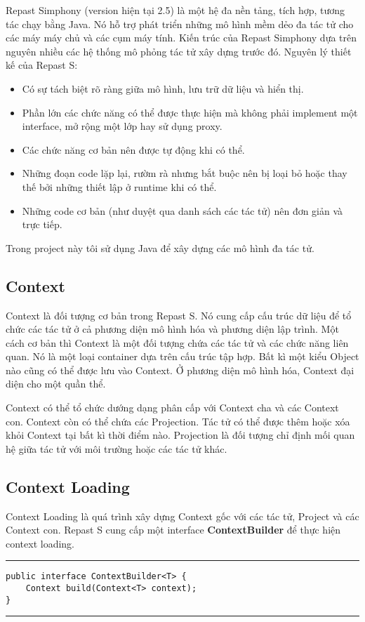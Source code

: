 \documentclass[../report.tex]{subfiles}
\begin{document}
\newcommand{\HRule}{\rule{\linewidth}{1pt}} %

Repast Simphony (version hiện tại 2.5) là một hệ đa nền tảng, tích hợp, tương tác chạy bằng Java. Nó hỗ trợ 
phát triển những mô hình mềm dẻo đa tác tử cho các máy máy chủ và các cụm máy tính. \cite{repast-simphony}
Kiến trúc của Repast Simphony dựa trên nguyên nhiều các hệ thống mô phỏng tác tử xây dựng trước đó. 
Nguyên lý thiết kế của Repast S: \cite{repast-reference}
\begin{itemize}
    \item Có sự tách biệt rõ ràng giữa mô hình, lưu trữ dữ liệu và hiển thị. 
    \item Phần lớn các chức năng có thể được thực hiện mà không phải implement một interface, mở rộng 
        một lớp hay sử dụng proxy. 
    \item Các chức năng cơ bản nên được tự động khi có thể.
    \item Những đoạn code lặp lại, rườm rà nhưng bắt buộc nên bị loại bỏ hoặc thay thế bởi những thiết lập ở runtime khi có thể. 
    \item Những code cơ bản (như duyệt qua danh sách các tác tử) nên đơn giản và trực tiếp. 
\end{itemize}

Trong project này tôi sử dụng Java để xây dựng các mô hình đa tác tử. 

\subsection{Context}
Context là đối tượng cơ bản trong Repast S. Nó cung cấp cấu trúc dữ liệu để tổ chức các tác tử 
ở cả phương diện mô hình hóa và phương diện lập trình. 
Một cách cơ bản thì Context là một đối tượng chứa các tác tử và các chức năng liên quan. Nó là một loại 
container dựa trên cấu trúc tập hợp. Bất kì một kiểu Object nào cũng có thể được lưu vào Context. 
Ở phương diện mô hình hóa, Context đại diện cho một quần thể. 

Context có thể tổ chức dướng dạng phân cấp với Context cha và các Context con. Context còn có thể chứa các 
Projection. Tác tử có thể được thêm hoặc xóa khỏi Context tại bất kì thời điểm nào. Projection là đối tượng 
chỉ định mối quan hệ giữa tác tử với môi trường hoặc các tác tử khác. 

\subsection{Context Loading}
Context Loading là quá trình xây dựng Context gốc với các tác tử, Project và các Context con. Repast S cung 
cấp một interface \textbf{ContextBuilder} để thực hiện context loading.  \\
\HRule
\begin{lstlisting}
public interface ContextBuilder<T> {
    Context build(Context<T> context);
}
\end{lstlisting}
\HRule
\end{document}
